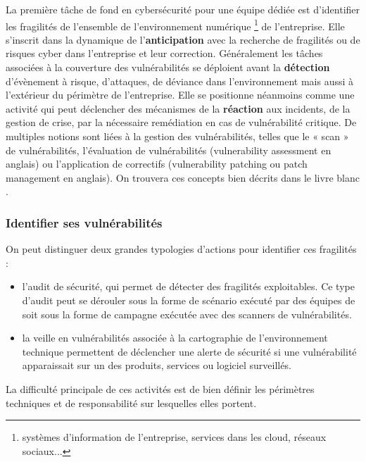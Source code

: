 La première tâche de fond en cybersécurité pour une équipe dédiée est d'identifier les fragilités de l'ensemble de l'environnement numérique \footnote{systèmes d'information de l'entreprise, services dans les cloud, réseaux sociaux...} de l'entreprise. Elle s'inscrit dans la dynamique de l'\textbf{anticipation} avec la recherche de fragilités ou de risques cyber dans l'entreprise et leur correction. Généralement les tâches associées à la couverture des vulnérabilités se déploient avant la \textbf{détection} d'évènement à risque, d'attaques, de déviance dans l'environnement mais aussi à l'extérieur du périmètre de l'entreprise.
Elle se positionne néanmoins comme une activité qui peut déclencher des mécanismes de la \textbf{réaction} aux incidents, de la gestion de crise, par la nécessaire remédiation en cas de vulnérabilité critique.
De multiples notions sont liées à la gestion des vulnérabilités, telles que le « scan » de vulnérabilités, l’évaluation de vulnérabilités (vulnerability assessment en anglais) ou l’application de correctifs (vulnerability patching ou patch management en anglais). On trouvera ces concepts bien décrits dans le livre blanc .


\begin{frame}
\frametitle<presentation>{Identifier ses vulnérabilités}
On peut distinguer deux grandes typologies d'actions pour identifier ces fragilités :
\begin{itemize}
	\item l'audit de sécurité, qui permet de détecter des fragilités exploitables. Ce type d'audit peut se dérouler sous la forme de scénario exécuté par des équipes de  soit sous la forme de campagne exécutée avec des scanners de vulnérabilités.
	\item la veille en vulnérabilités associée à la cartographie de l'environnement technique permettent de déclencher une alerte de sécurité si une vulnérabilité apparaissait sur un des produits, services ou logiciel surveillés.
\end{itemize}
\end{frame}

La difficulté principale de ces activités est de bien définir les périmètres techniques et de responsabilité sur lesquelles elles portent.

